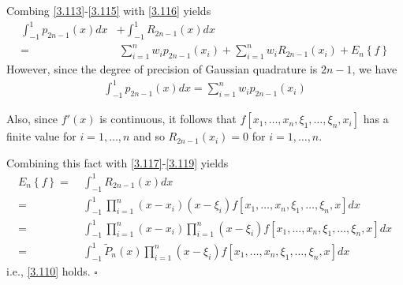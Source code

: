 \documentclass[a4paper]{article}
\numberwithin{equation}{section}
\begin{document}
Combing \eqref{3.113}-\eqref{3.115} with \eqref{3.116} yields
\begin{align}
\label{3.117}
\int_{ - 1}^1 {{p_{2n - 1}}\left( x \right)dx}  &+ \int_{ - 1}^1 {{R_{2n - 1}}\left( x \right)dx} \\
=&\ \sum\limits_{i = 1}^n {{w_i}{p_{2n - 1}}\left( {{x_i}} \right)}  + \sum\limits_{i = 1}^n {{w_i}{R_{2n - 1}}\left( {{x_i}} \right)}  + {E_n}\left\{ f \right\}
\end{align}
However, since the degree of precision of Gaussian quadrature is $2n-1$, we have
\begin{align}
\label{3.119}
\int_{ - 1}^1 {{p_{2n - 1}}\left( x \right)dx}  = \sum\limits_{i = 1}^n {{w_i}{p_{2n - 1}}\left( {{x_i}} \right)}  
\end{align}

Also, since $f'\left(x\right)$ is continuous, it follows that $f\left[ {{x_1}, \ldots ,{x_n},{\xi _1}, \ldots ,{\xi _n},x_i} \right]$ has a finite value for $i=1,\ldots,n$ and so $R_{2n-1}\left(x_i\right)=0$ for $i=1,\ldots,n$. 

Combining this fact with \eqref{3.117}-\eqref{3.119} yields
\begin{align}
{E_n}\left\{ f \right\} =&\ \int_{ - 1}^1 {{R_{2n - 1}}\left( x \right)dx} \\
 =&\ \int_{ - 1}^1 {\prod\limits_{i = 1}^n {\left( {x - {x_i}} \right)\left( {x - {\xi _i}} \right)} f\left[ {{x_1}, \ldots ,{x_n},{\xi _1}, \ldots ,{\xi _n},x} \right]dx} \\
=&\ \int_{ - 1}^1 {\prod\limits_{i = 1}^n {\left( {x - {x_i}} \right)} \prod\limits_{i = 1}^n {\left( {x - {\xi _i}} \right)} f\left[ {{x_1}, \ldots ,{x_n},{\xi _1}, \ldots ,{\xi _n},x} \right]dx} \\
 =&\ \int_{ - 1}^1 {{\widetilde P_n}\left( x \right)\prod\limits_{i = 1}^n {\left( {x - {\xi _i}} \right)} f\left[ {{x_1}, \ldots ,{x_n},{\xi _1}, \ldots ,{\xi _n},x} \right]dx} 
\end{align}
i.e., \eqref{3.110} holds. \hfill $\square$\\
\end{document}
